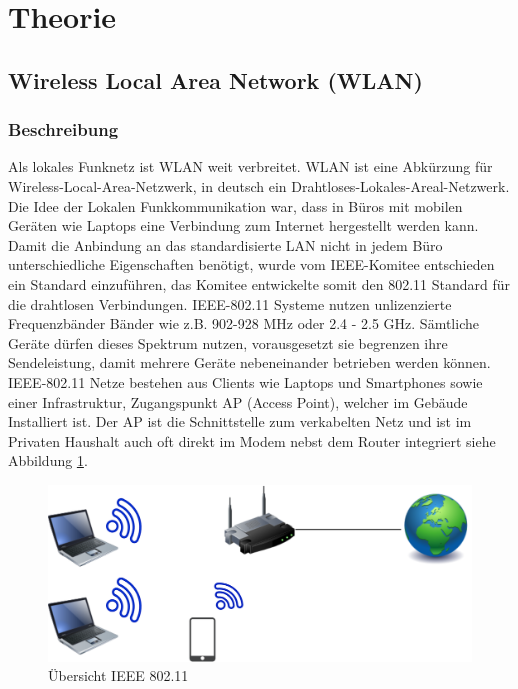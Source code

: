 \section{Theorie}
\subsection{Wireless Local Area Network (WLAN)}
\subsubsection{Beschreibung}
Als lokales Funknetz ist WLAN weit verbreitet. WLAN ist eine Abkürzung für Wireless-Local-Area-Netzwerk, in deutsch ein Drahtloses-Lokales-Areal-Netzwerk. Die Idee der Lokalen Funkkommunikation war, dass in Büros mit mobilen Geräten wie Laptops eine Verbindung zum Internet hergestellt werden kann. Damit die Anbindung an das standardisierte LAN nicht in jedem Büro unterschiedliche Eigenschaften benötigt, wurde vom IEEE-Komitee entschieden ein Standard einzuführen, das Komitee entwickelte somit den 802.11 Standard für die drahtlosen Verbindungen. IEEE-802.11 Systeme nutzen unlizenzierte Frequenzbänder Bänder wie z.B. 902-928 MHz oder 2.4 - 2.5 GHz. Sämtliche Geräte dürfen dieses Spektrum nutzen, vorausgesetzt sie begrenzen ihre Sendeleistung, damit mehrere Geräte nebeneinander betrieben werden können. IEEE-802.11 Netze bestehen aus Clients wie Laptops und Smartphones sowie einer Infrastruktur, Zugangspunkt AP (Access Point), welcher im Gebäude Installiert ist. Der AP ist die Schnittstelle zum verkabelten Netz und ist im Privaten Haushalt auch oft direkt im Modem nebst dem Router integriert siehe Abbildung \ref{pic: IEEE802.11}.


 \begin{figure}[H]
	\centering
	\includegraphics[width=\textwidth]{graphics/IEEE80211.png}
	\caption{Übersicht IEEE 802.11} 	
	\label{pic: IEEE802.11}
\end{figure} 
